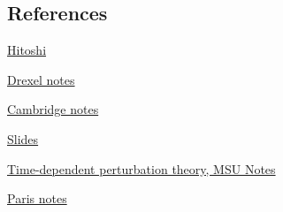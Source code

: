 \subsection{References}

\begin{thebibliography}

\href{http://hitoshi.berkeley.edu/221a/timedependent.pdf}{Hitoshi}

\href{http://www.physics.drexel.edu/~bob/Chapters/time_dep_pt.pdf}{Drexel notes}

\href{http://www.tcm.phy.cam.ac.uk/~bds10/aqp/handout_dep.pdf}{Cambridge notes}

\href{http://www.tcm.phy.cam.ac.uk/~bds10/aqp/lec18.pdf}{Slides} 


\href{http://www.pa.msu.edu/~mmoore/TDPT.pdf}{Time-dependent perturbation theory, MSU Notes}

\href{http://web.mst.edu/~parris/QuantumTwo/Class_Notes/TDPT.pdf}{Paris notes}

\end{thebibliography}

